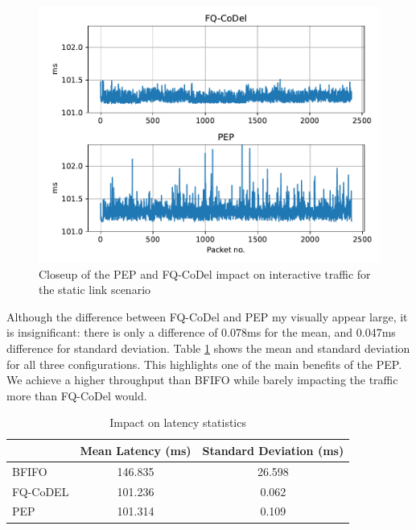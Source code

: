 \documentclass[a4paper,english, 12pt]{report}
\begin{document}
\begin{figure}[!h!] %
	\centering
	\includegraphics[scale=0.70]{../diagrams/witestlab/throughput/throughput_latency_closeup_sl.pdf}
  	\caption{Closeup of the PEP and FQ-CoDel impact on interactive traffic for the static link scenario}
  	\label{fig:throughput_latency_closeup_sl}
\end{figure}

Although the difference between FQ-CoDel and PEP my visually appear large, it is insignificant: there is only a difference of 0.078ms for the mean, and 0.047ms difference for standard deviation. Table \ref{tab:throughput_latency_stats_sl} shows the mean and standard deviation for all three configurations. This highlights one of the main benefits of the PEP. We achieve a higher throughput than BFIFO while barely impacting the traffic more than FQ-CoDel would.\\

\begin{table}[h!]
\centering
\begin{tabular}{l|c|c}
\hline
 & \textbf{Mean Latency (ms)} & \textbf{Standard Deviation (ms)} \\
\hline
BFIFO    & 146.835 & 26.598 \\
FQ-CoDEL  & 101.236 & 0.062 \\
PEP      & 101.314 & 0.109 \\
\hline
\end{tabular}
\caption{Impact on latency statistics}
\label{tab:throughput_latency_stats_sl}
\end{table}
\end{document}
